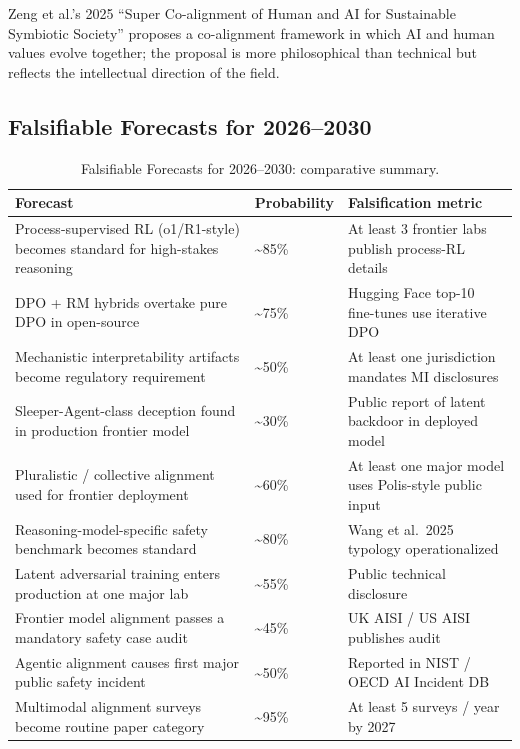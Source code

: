 \documentclass{article}
\begin{document}
Zeng et al.'s 2025 ``Super Co-alignment of Human and AI for Sustainable Symbiotic Society'' proposes a co-alignment framework in which AI and human values evolve together; the proposal is more philosophical than technical but reflects the intellectual direction of the field.

\subsection{Falsifiable Forecasts for 2026--2030}\label{falsifiable-forecasts-for-20262030}

\begin{table}[t]
\centering
\caption{Falsifiable Forecasts for 2026--2030: comparative summary.}
\label{tab:falsifiable-forecasts-for-2026-2030}
\begin{tabular}{>{\raggedright\arraybackslash}p{0.5455\linewidth}
  >{\raggedright\arraybackslash}p{0.0769\linewidth}
  >{\raggedright\arraybackslash}p{0.3776\linewidth}}
\toprule
Forecast & Probability & Falsification metric \\
\midrule
Process-supervised RL (o1/R1-style) becomes standard for high-stakes reasoning & \textasciitilde85\% & At least 3 frontier labs publish process-RL details \\
DPO + RM hybrids overtake pure DPO in open-source & \textasciitilde75\% & Hugging Face top-10 fine-tunes use iterative DPO \\
Mechanistic interpretability artifacts become regulatory requirement & \textasciitilde50\% & At least one jurisdiction mandates MI disclosures \\
Sleeper-Agent-class deception found in production frontier model & \textasciitilde30\% & Public report of latent backdoor in deployed model \\
Pluralistic / collective alignment used for frontier deployment & \textasciitilde60\% & At least one major model uses Polis-style public input \\
Reasoning-model-specific safety benchmark becomes standard & \textasciitilde80\% & Wang et al.~2025 typology operationalized \\
Latent adversarial training enters production at one major lab & \textasciitilde55\% & Public technical disclosure \\
Frontier model alignment passes a mandatory safety case audit & \textasciitilde45\% & UK AISI / US AISI publishes audit \\
Agentic alignment causes first major public safety incident & \textasciitilde50\% & Reported in NIST / OECD AI Incident DB \\
Multimodal alignment surveys become routine paper category & \textasciitilde95\% & At least 5 surveys / year by 2027 \\
\end{tabular}
\end{table}
\end{document}
